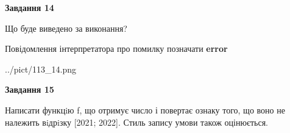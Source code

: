 \documentclass[11pt, ukrainian]{article}
\begin{document}
{\begin {large}
{\begin {center}\textbf{Завдання 14}\end {center}}\par
Що буде виведено за виконання? \par
Повідомлення інтерпретатора про помилку позначати \textbf{error}

\begin{center}
	{../pict/113_14.png}
\end{center}
\newpage

{\begin {center}\textbf{Завдання 15}\end {center}}\par

Написати функцiю f, що отримує число і повертає ознаку того, що воно не належить вiдрiзку [2021; 2022]. Стиль запису умови також оцінюється.\par
\newpage

\end {large}}
\end{document}
